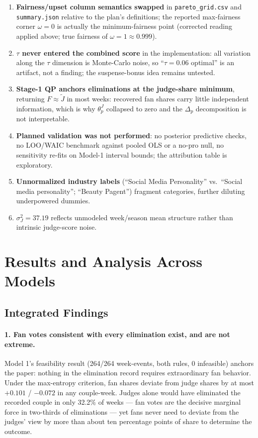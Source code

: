 \documentclass[11pt]{article}
\begin{document}
\begin{enumerate}[itemsep=1pt]
  \item \textbf{Fairness/upset column semantics swapped} in \texttt{pareto\_grid.csv}
        and \texttt{summary.json} relative to the plan's definitions; the reported
        max-fairness corner $\omega = 0$ is actually the minimum-fairness point
        (corrected reading applied above; true fairness of $\omega = 1 \approx 0.999$).
  \item \textbf{$\tau$ never entered the combined score} in the implementation: all
        variation along the $\tau$ dimension is Monte-Carlo noise, so ``$\tau = 0.06$
        optimal'' is an artifact, not a finding; the suspense-bonus idea remains
        untested.
  \item \textbf{Stage-1 QP anchors eliminations at the judge-share minimum}, returning
        $F \approx \tilde{J}$ in most weeks: recovered fan shares carry little
        independent information, which is why $\theta^J_p$ collapsed to zero and the
        $\Delta_p$ decomposition is not interpretable.
  \item \textbf{Planned validation was not performed}: no posterior predictive checks,
        no LOO/WAIC benchmark against pooled OLS or a no-pro null, no sensitivity
        re-fits on Model-1 interval bounds; the attribution table is exploratory.
  \item \textbf{Unnormalized industry labels} (``Social Media Personality'' vs.\ ``Social
        media personality''; ``Beauty Pagent'') fragment categories, further diluting
        underpowered dummies.
  \item $\sigma^2_J = 37.19$ reflects unmodeled week/season mean structure rather than
        intrinsic judge-score noise.
\end{enumerate}

\section{Results and Analysis Across Models}
\label{sec:results}

\subsection{Integrated Findings}

\paragraph{1. Fan votes consistent with every elimination exist, and are not extreme.}
Model 1's feasibility result (264/264 week-events, both rules, 0 infeasible) anchors the
paper: nothing in the elimination record requires extraordinary fan behavior. Under the
max-entropy criterion, fan shares deviate from judge shares by at most $+0.101$ /
$-0.072$ in any couple-week. Judges alone would have eliminated the recorded couple in
only 32.2\% of weeks --- fan votes are the decisive marginal force in two-thirds of
eliminations --- yet fans never need to deviate from the judges' view by more than
about ten percentage points of share to determine the outcome.
\end{document}
